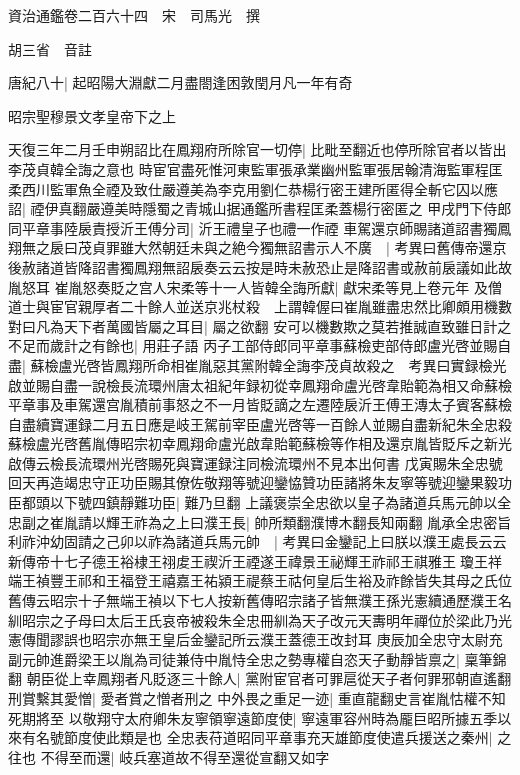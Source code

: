 資治通鑑卷二百六十四　宋　司馬光　撰

胡三省　音註

唐紀八十|{
	起昭陽大淵獻二月盡閤逢困敦閏月凡一年有奇}


昭宗聖穆景文孝皇帝下之上

天復三年二月壬申朔詔比在鳳翔府所除官一切停|{
	比毗至翻近也停所除官者以皆出李茂貞韓全誨之意也}
時宦官盡死惟河東監軍張承業幽州監軍張居翰清海監軍程匡柔西川監軍魚全禋及致仕嚴遵美為李克用劉仁恭楊行密王建所匿得全斬它囚以應詔|{
	禋伊真翻嚴遵美時隱蜀之青城山据通鑑所書程匡柔蓋楊行密匿之}
甲戌門下侍郎同平章事陸扆責授沂王傅分司|{
	沂王禮皇子也禮一作禋}
車駕還京師賜諸道詔書獨鳳翔無之扆曰茂貞罪雖大然朝廷未與之絶今獨無詔書示人不廣　|{
	考異曰舊傳帝還京後赦諸道皆降詔書獨鳳翔無詔扆奏云云按是時未赦恐止是降詔書或赦前扆議如此故胤怒耳}
崔胤怒奏貶之宫人宋柔等十一人皆韓全誨所獻|{
	獻宋柔等見上卷元年}
及僧道士與宦官親厚者二十餘人並送京兆杖殺　上謂韓偓曰崔胤雖盡忠然比卿頗用機數對曰凡為天下者萬國皆屬之耳目|{
	屬之欲翻}
安可以機數欺之莫若推誠直致雖日計之不足而歲計之有餘也|{
	用莊子語}
丙子工部侍郎同平章事蘇檢吏部侍郎盧光啓並賜自盡|{
	蘇檢盧光啓皆鳳翔所命相崔胤惡其黨附韓全誨李茂貞故殺之　考異曰實録檢光啟並賜自盡一說檢長流環州唐太祖紀年録初從幸鳳翔命盧光啓韋貽範為相又命蘇檢平章事及車駕還宫胤積前事怒之不一月皆貶謫之左遷陸扆沂王傅王漙太子賓客蘇檢自盡續寶運録二月五日應是岐王駕前宰臣盧光啓等一百餘人並賜自盡新紀朱全忠殺蘇檢盧光啓舊胤傳昭宗初幸鳳翔命盧光啟韋貽範蘇檢等作相及還京胤皆貶斥之新光啟傳云檢長流環州光啓賜死與寶運録注同檢流環州不見本出何書}
戊寅賜朱全忠號回天再造竭忠守正功臣賜其僚佐敬翔等號迎鑾恊贊功臣諸將朱友寧等號迎鑾果毅功臣都頭以下號四鎮靜難功臣|{
	難乃旦翻}
上議褒崇全忠欲以皇子為諸道兵馬元帥以全忠副之崔胤請以輝王祚為之上曰濮王長|{
	帥所類翻濮博木翻長知兩翻}
胤承全忠密旨利祚沖幼固請之己卯以祚為諸道兵馬元帥　|{
	考異曰金鑾記上曰朕以濮王處長云云新傳帝十七子德王裕棣王祤䖍王禊沂王禋遂王禕景王祕輝王祚祁王祺雅王瓊王祥端王禎豐王祁和王福登王禧嘉王祐潁王禔蔡王祜何皇后生裕及祚餘皆失其母之氏位舊傳云昭宗十子無端王禎以下七人按新舊傳昭宗諸子皆無濮王孫光憲續通歷濮王名紃昭宗之子母曰太后王氏哀帝被殺朱全忠冊紃為天子改元天夀明年禪位於梁此乃光憲傳聞謬誤也昭宗亦無王皇后金鑾記所云濮王蓋德王改封耳}
庚辰加全忠守太尉充副元帥進爵梁王以胤為司徒兼侍中胤恃全忠之勢專權自恣天子動靜皆禀之|{
	稟筆錦翻}
朝臣從上幸鳳翔者凡貶逐三十餘人|{
	黨附宦官者可罪扈從天子者何罪邪朝直遙翻}
刑賞繫其愛憎|{
	愛者賞之憎者刑之}
中外畏之重足一迹|{
	重直龍翻史言崔胤怙權不知死期將至}
以敬翔守太府卿朱友寧領寧遠節度使|{
	寧遠軍容州時為龎巨昭所據五季以來有名號節度使此類是也}
全忠表苻道昭同平章事充天雄節度使遣兵援送之秦州|{
	之往也}
不得至而還|{
	岐兵塞道故不得至還從宣翻又如字}
